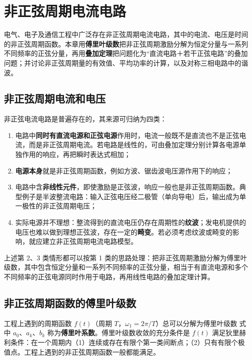 \chapter{非正弦周期电流电路}

\noindent
电气、电子及通信工程中广泛存在非正弦周期电流电路，其中的电流、电压是时间的非正弦周期函数。本章用\textbf{傅里叶级数}把非正弦周期激励分解为恒定分量与一系列不同频率的正弦分量，再用\textbf{叠加定理}把问题化为“直流电路＋若干正弦电路”的叠加问题；并讨论非正弦周期量的有效值、平均功率的计算，以及对称三相电路中的谐波。

\section{非正弦周期电流和电压}
非正弦电流电路是普遍存在的，其来源可归纳为四类：
\begin{enumerate}
  \item 电路中\textbf{同时有直流电源和正弦电源}作用时，电流一般既不是直流也不是正弦电流，而是非正弦周期电流。若电路是线性的，可由叠加定理分别计算各电源单独作用的响应，再把瞬时表达式相加；
  \item \textbf{电源本身}就是非正弦周期函数，例如方波、锯齿波电压源作用下的响应；
  \item 电路中含\textbf{非线性元件}，即使激励是正弦波，响应一般也是非正弦周期函数。典型例子是半波整流电路：输入正弦电压经二极管（单向导电）后，输出成为单一极性的非正弦周期电压；
  \item 实际电源并不理想：整流得到的直流电压仍存在周期性的\textbf{纹波}；发电机提供的电压也难以做到理想正弦波，存在一定的\textbf{畸变}。若必须考虑纹波或畸变的影响，就应建立非正弦周期电流电路模型。
\end{enumerate}

上述第 2、3 类情形都可以按第 1 类的思路处理：把非正弦周期激励分解为傅里叶级数，其中包含恒定分量和一系列不同频率的正弦分量，相当于有直流电源和多个不同频率的正弦电源同时作用于电路，再用线性电路的叠加定理计算。


\section{非正弦周期函数的傅里叶级数}
工程上遇到的周期函数 $f(t)$（周期 $T$，$\omega_1=2\pi/T$）总可以分解为傅里叶级数
式中 $a_0$、$a_k$、$b_k$ 称为\textbf{傅里叶系数}。傅里叶级数收敛的充分条件是 $f(t)$ 满足狄里赫利条件：在一个周期内（1）连续或存在有限个第一类间断点；（2）只有有限个极值点。工程上遇到的非正弦周期函数一般都能满足。

